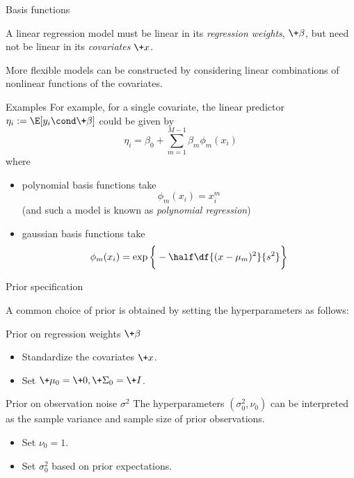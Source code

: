 \documentclass[10pt]{beamer}
\begin{document}
\begin{frame}{Basis functions}
	
A linear regression model must be linear in its \textit{regression weights}, $\+\beta$, but need not be linear in its \textit{covariates} $\+x$.

More flexible models can be constructed by considering linear combinations of nonlinear functions of the covariates.



\begin{sblock}{Examples}
\pause \scriptsize 
For example, for a single covariate, the linear predictor $\eta_i := \E[y_i \cond \+\beta]$ could be given by
 \[ \eta_i  = \beta_0 + \sum_{m=1}^{M-1} \beta_{m} \phi_m(x_i)\]
 where
\begin{itemize}
\item polynomial basis functions take
 \[ \phi_m(x_i) = x_i^m \] 
 \hfill {\tiny (and such a model is known as \textit{polynomial regression})}
\item gaussian basis functions take
\[ \phi_m(x_i) = \exp \bigg\{ -\half \df{(x-\mu_m)^2}{s^2} \bigg\} \] 
\end{itemize}
\end{sblock}

\end{frame}

\begin{frame}{Prior specification}

A common choice of prior is obtained by setting the hyperparameters as follows:

\begin{sblock}{Prior on regression weights $\+\beta$}
\begin{itemize}
\item Standardize the covariates $\+x$.
\item Set $\+\mu_0 =\+0, \+\Sigma_0 = \+I$.
\end{itemize}
\end{sblock}

\begin{sblock}{Prior on observation noise $\sigma^2$}
The hyperparameters $(\sigma_0^2,  \nu_0)$ can be interpreted as the sample variance and sample size of prior observations.

\begin{itemize}
\item Set $\nu_0=1$.
\item Set $\sigma_0^2$ based on prior expectations.
\end{itemize}
\end{sblock}
\end{frame}
\end{document}
